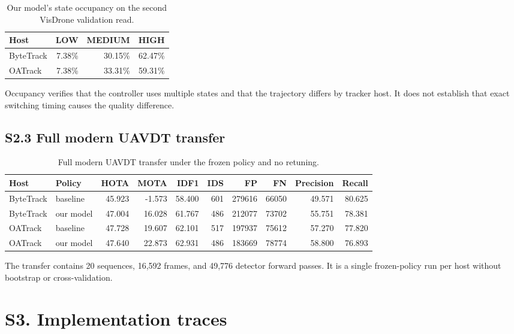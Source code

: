 \documentclass[11pt]{article}
\begin{document}
\begin{table}[ht]
\centering\small
\caption{Our model's state occupancy on the second VisDrone validation read.}
\label{tab:s2-occupancy}
\begin{tabular}{lrrr}
\toprule
Host & LOW & MEDIUM & HIGH\\
\midrule
ByteTrack & 7.38\% & 30.15\% & 62.47\%\\
OATrack & 7.38\% & 33.31\% & 59.31\%\\
\bottomrule
\end{tabular}
\end{table}

Occupancy verifies that the controller uses multiple states and that the
trajectory differs by tracker host. It does not establish that exact switching
timing causes the quality difference.

\subsection*{S2.3 Full modern UAVDT transfer}

\begin{table}[ht]
\centering\scriptsize
\caption{Full modern UAVDT transfer under the frozen policy and no retuning.}
\label{tab:s2-uavdt}
\begin{tabular}{llrrrrrrrr}
\toprule
Host & Policy & HOTA & MOTA & IDF1 & IDS & FP & FN & Precision & Recall\\
\midrule
ByteTrack & baseline & 45.923 & -1.573 & 58.400 & 601 & 279616 & 66050 & 49.571 & 80.625\\
ByteTrack & our model & 47.004 & 16.028 & 61.767 & 486 & 212077 & 73702 & 55.751 & 78.381\\
OATrack & baseline & 47.728 & 19.607 & 62.101 & 517 & 197937 & 75612 & 57.270 & 77.820\\
OATrack & our model & 47.640 & 22.873 & 62.931 & 486 & 183669 & 78774 & 58.800 & 76.893\\
\bottomrule
\end{tabular}
\end{table}

The transfer contains 20 sequences, 16,592 frames, and 49,776 detector
forward passes. It is a single frozen-policy run per host without bootstrap or
cross-validation.

\section*{S3. Implementation traces}
\end{document}
